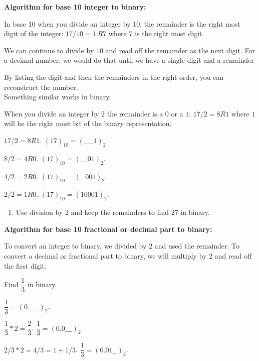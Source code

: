 \documentclass[12pt,letterpaper,noanswers]{exam}
\begin{document}
\vspace{0.5in}

\textbf{Algorithm for base 10 integer to binary:}
\begin{tcolorbox}


In base $10$ when you divide an integer by $10$, the remainder is the right most digit of the integer: $17/10 = 1\ R7$ where $7$ is the right most digit.

We can continue to divide by $10$ and read off the remainder as the next digit.  For a decimal number, we would do that until we have a single digit and a remainder

By listing the digit and then the remainders in the right order, you can reconstruct the number. \\


Something similar works in binary.

When you divide an integer by $2$ the remainder is a $0$ or a $1$:
$17/2 = 8 R1$ where $1$ will be the right most bit of the binary representation.


\end{tcolorbox}


$17/2 = 8 R1$.  $(17)_{10} = (\_ \_ \_ \_ 1)_2$.

$8/2 = 4 R0$.  $(17)_{10} = (\_ \_ \_ 0 1)_2$.

$4/2 = 2 R0$.  $(17)_{10} = (\_ \_ 0 0 1)_2$.

$2/2 = 1 R0$.  $(17)_{10} = (1 0 0 0 1)_2$.

\begin{enumerate}[resume]
    \item Use division by $2$ and keep the remainders to find $27$ in binary.
\end{enumerate}
\vspace{1.2in}

\textbf{Algorithm for base 10 fractional or decimal part to binary:}

\begin{tcolorbox}
    To convert an integer to binary, we divided by $2$ and used the remainder.  To convert a decimal or fractional part to binary, we will multiply by $2$ and read off the first digit.
\end{tcolorbox}

Find $\dfrac{1}{3}$ in binary.

$\dfrac{1}{3} = (0. \_ \_ \_ \_)_2$.

$\dfrac{1}{3}*2 = \dfrac{2}{3}$.    $\dfrac{1}{3} = (0.0 \_ \_ \_)_2$.

$2/3 * 2 = 4/3 = 1 + 1/3$.  $\dfrac{1}{3} = (0.01\_ \_)_2$. 
\end{document}
